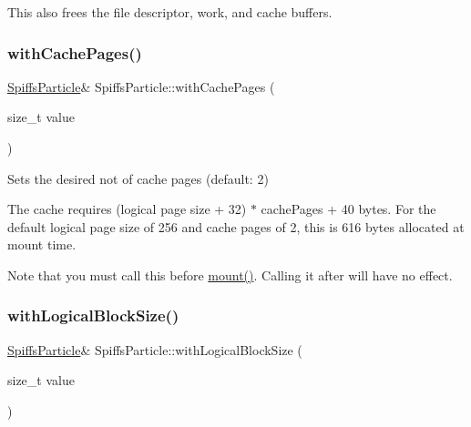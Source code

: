 This also frees the file descriptor, work, and cache buffers. \mbox{\label{class_spiffs_particle_afc11a0266e8be6fb84ec4735d58281cb}} 
\subsubsection{\texorpdfstring{with\+Cache\+Pages()}{withCachePages()}}
{\footnotesize\ttfamily \mbox{\hyperlink{class_spiffs_particle}{Spiffs\+Particle}}\& Spiffs\+Particle\+::with\+Cache\+Pages (\begin{DoxyParamCaption}\item[{size\+\_\+t}]{value }\end{DoxyParamCaption})\hspace{0.3cm}{\ttfamily [inline]}}



Sets the desired not of cache pages (default\+: 2) 

The cache requires (logical page size + 32) $\ast$ cache\+Pages + 40 bytes. For the default logical page size of 256 and cache pages of 2, this is 616 bytes allocated at mount time.

Note that you must call this before \mbox{\hyperlink{class_spiffs_particle_a55ce37570d764bb8d00698903211fee8}{mount()}}. Calling it after will have no effect. \mbox{\label{class_spiffs_particle_a9f04b3f3f10aacad3281a8abaf14bac6}} 
\subsubsection{\texorpdfstring{with\+Logical\+Block\+Size()}{withLogicalBlockSize()}}
{\footnotesize\ttfamily \mbox{\hyperlink{class_spiffs_particle}{Spiffs\+Particle}}\& Spiffs\+Particle\+::with\+Logical\+Block\+Size (\begin{DoxyParamCaption}\item[{size\+\_\+t}]{value }\end{DoxyParamCaption})\hspace{0.3cm}{\ttfamily [inline]}}



